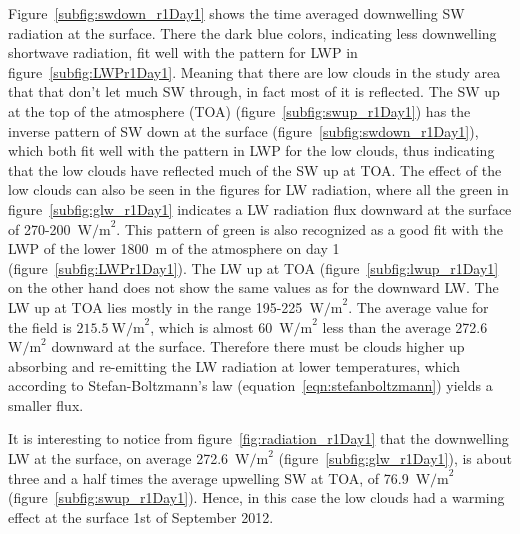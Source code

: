 Figure~\ref{subfig:swdown_r1Day1} shows the time averaged downwelling SW radiation at the surface. There the dark blue colors, indicating less downwelling shortwave radiation, fit well with the pattern for LWP in figure~\ref{subfig:LWPr1Day1}. Meaning that there are low clouds in the study area that that don't let much SW through, in fact most of it is reflected. The SW up at the top of the atmosphere (TOA) (figure~\ref{subfig:swup_r1Day1}) has the inverse pattern of SW down at the surface (figure~\ref{subfig:swdown_r1Day1}), which both fit well with the pattern in LWP for the low clouds, thus indicating that the low clouds have reflected much of the SW up at TOA. The effect of the low clouds can also be seen in the figures for LW radiation, where all the green in figure~\ref{subfig:glw_r1Day1} indicates a LW radiation flux downward at the surface of 270-200~$\text{W/m}^2$. This pattern of green is also recognized as a good fit with the LWP of the lower 1800~m of the atmosphere on day 1 (figure~\ref{subfig:LWPr1Day1}). The LW up at TOA (figure~\ref{subfig:lwup_r1Day1} on the other hand does not show the same values as for the downward LW. The LW up at TOA lies mostly in the range 195-225~$\text{W/m}^2$. The average value for the field is $215.5~\text{W/m}^2$, which is almost 60~$\text{W/m}^2$ less than the average 272.6~$\text{W/m}^2$ downward at the surface. Therefore there must be clouds higher up absorbing and re-emitting the LW radiation at lower temperatures, which according to Stefan-Boltzmann's law (equation~\ref{eqn:stefanboltzmann}) yields a smaller flux.

It is interesting to notice from figure~\ref{fig:radiation_r1Day1} that the downwelling LW at the surface, on average 272.6~$\text{W/m}^2$ (figure~\ref{subfig:glw_r1Day1}), is about three and a half times the average upwelling SW at TOA, of 76.9~$\text{W/m}^2$ (figure~\ref{subfig:swup_r1Day1}). Hence, in this case the low clouds had a warming effect at the surface 1st of September 2012.

